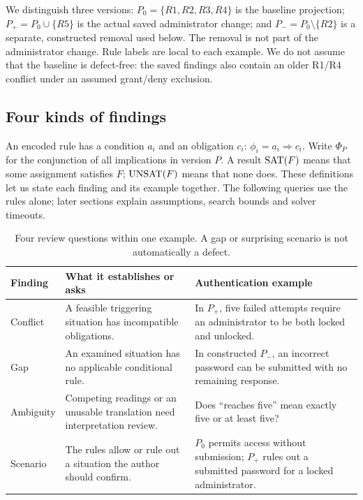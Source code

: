 We distinguish three versions: $P_0=\{R1,R2,R3,R4\}$ is the baseline projection; $P_+=P_0\cup\{R5\}$ is the actual saved administrator change; and $P_-=P_0\setminus\{R2\}$ is a separate, constructed removal used below. The removal is not part of the administrator change. Rule labels are local to each example. We do not assume that the baseline is defect-free: the saved findings also contain an older R1/R4 conflict under an assumed grant/deny exclusion.

\subsection{Four kinds of findings}

An encoded rule has a condition $a_i$ and an obligation $c_i$: $\phi_i=a_i\Rightarrow c_i$. Write $\Phi_P$ for the conjunction of all implications in version $P$. A result $\operatorname{SAT}(F)$ means that some assignment satisfies $F$; $\operatorname{UNSAT}(F)$ means that none does. These definitions let us state each finding and its example together. The following queries use the rules alone; later sections explain assumptions, search bounds and solver timeouts.

\begin{table}[H]
\centering
\begin{tabularx}{\linewidth}{@{}lXX@{}}
\toprule
Finding & What it establishes or asks & Authentication example \\
\midrule
Conflict & A feasible triggering situation has incompatible obligations. & In $P_+$, five failed attempts require an administrator to be both locked and unlocked. \\
Gap & An examined situation has no applicable conditional rule. & In constructed $P_-$, an incorrect password can be submitted with no remaining response. \\
Ambiguity & Competing readings or an unusable translation need interpretation review. & Does ``reaches five'' mean exactly five or at least five? \\
Scenario & The rules allow or rule out a situation the author should confirm. & $P_0$ permits access without submission; $P_+$ rules out a submitted password for a locked administrator. \\
\bottomrule
\end{tabularx}
\caption{Four review questions within one example. A gap or surprising scenario is not automatically a defect.}
\end{table}


